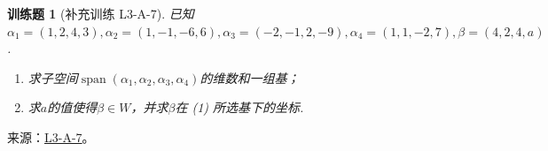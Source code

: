 \documentclass[UTF8,12pt,a4paper,fontset=fandol]{ctexart}
\newtheorem{exercise}{训练题}[section]
\begin{document}
\begin{exercise}[补充训练 L3-A-7]\label{prob:L3-A-7}
已知$\alpha_1=(1,2,4,3),\alpha_2=(1,-1,-6,6),\alpha_3=(-2,-1,2,-9),\alpha_4=(1,1,-2,7),\beta=(4,2,4,a)$.
        \begin{enumerate}
            \item 求子空间$\operatorname{span}(\alpha_1,\alpha_2,\alpha_3,\alpha_4)$的维数和一组基；

            \item 求$a$的值使得$\beta\in W$，并求$\beta$在 (1) 所选基下的坐标.
        \end{enumerate}
\end{exercise}
\noindent 来源：\href{https://github.com/yhwu-is/Linear-Algebra-Left-Undone/blob/new/%E8%AE%B2%E4%B9%89/%E4%B8%93%E9%A2%98/3%20%E6%9C%89%E9%99%90%E7%BB%B4%E7%BA%BF%E6%80%A7%E7%A9%BA%E9%97%B4.tex}{L3-A-7}。
\end{document}
